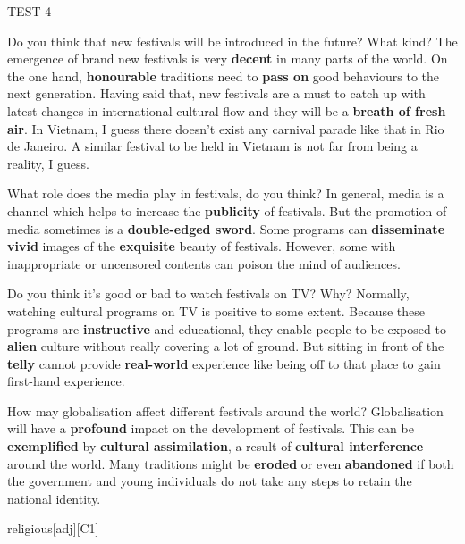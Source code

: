 \begin{glossarymc}[Cambridge 5]
\begin{test}{TEST 4}
    \begin{qa}{Do you think that new festivals will be introduced in the future? What kind?}
    The emergence of brand new festivals is very \textbf{decent} in many parts of the world. On the one hand, \textbf{honourable} traditions need to \textbf{pass on} good behaviours to the next generation. Having said that, new festivals are a must to catch up with latest changes in international cultural flow and they will be a \textbf{breath of fresh air}. In Vietnam, I guess there doesn’t exist any carnival parade like that in Rio de Janeiro. A similar festival to be held in Vietnam is not far from being a reality, I guess.
    \end{qa}

    \begin{qa}{What role does the media play in festivals, do you think?}
    In general, media is a channel which helps to increase the \textbf{publicity} of festivals. But the promotion of media sometimes is a \textbf{double-edged sword}. Some programs can \textbf{disseminate} \textbf{vivid} images of the \textbf{exquisite} beauty of festivals. However, some with inappropriate or uncensored contents can poison the mind of audiences.
    \end{qa}

    \begin{qa}{Do you think it's good or bad to watch festivals on TV? Why?}
    Normally, watching cultural programs on TV is positive to some extent. Because these programs are \textbf{instructive} and educational, they enable people to be exposed to \textbf{alien} culture without really covering a lot of ground. But sitting in front of the \textbf{telly} cannot provide \textbf{real-world} experience like being off to that place to gain first-hand experience.
    \end{qa}

    \begin{qa}{How may globalisation affect different festivals around the world?}
    Globalisation will have a \textbf{profound} impact on the development of festivals. This can be \textbf{exemplified} by \textbf{cultural assimilation}, a result of \textbf{cultural interference} around the world. Many traditions might be \textbf{eroded} or even \textbf{abandoned} if both the government and young individuals do not take any steps to retain the national identity.
    \end{qa}

        \begin{VocabExplain}[Part 3]
            \begin{ExplainCard}{religious}[adj][C1]
            \end{ExplainCard}


\end{VocabExplain}
\end{test}
\end{glossarymc}
